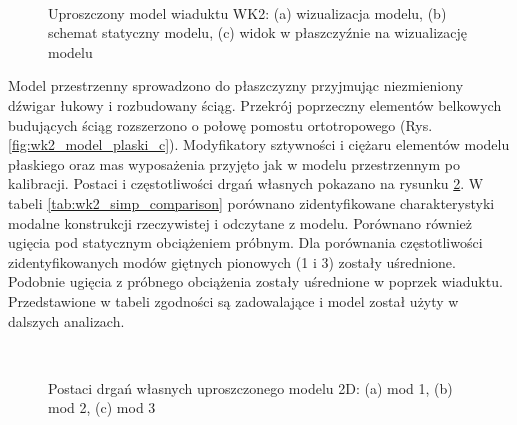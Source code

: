 \begin{figure}
	\centering
	\begin{minipage}{0.7\textwidth}
	\\
	\end{minipage}\qquad
	\begin{minipage}{0.15\textwidth}
	\end{minipage}
	\captionsetup{justification=centering}
	\caption{Uproszczony model wiaduktu WK2: (a) wizualizacja modelu, (b) schemat statyczny modelu, (c) widok w płaszczyźnie na wizualizację modelu}
	\label{fig:wk2_model_plaski}
\end{figure}



Model przestrzenny sprowadzono do płaszczyzny przyjmując niezmieniony dźwigar łukowy i rozbudowany ściąg. Przekrój poprzeczny elementów belkowych budujących ściąg rozszerzono o połowę pomostu ortotropowego (Rys. \ref{fig:wk2_model_plaski_c}). Modyfikatory sztywności i ciężaru elementów modelu płaskiego oraz mas wyposażenia przyjęto jak w modelu przestrzennym po kalibracji. Postaci i częstotliwości drgań własnych pokazano na rysunku \ref{fig:wk2_upr_mods}. W tabeli \ref{tab:wk2_simp_comparison} porównano zidentyfikowane charakterystyki modalne konstrukcji rzeczywistej i odczytane z modelu. Porównano również ugięcia pod statycznym obciążeniem próbnym. Dla porównania częstotliwości zidentyfikowanych modów giętnych pionowych (1 i 3) zostały uśrednione. Podobnie ugięcia z próbnego obciążenia zostały uśrednione w poprzek wiaduktu.
Przedstawione w tabeli zgodności są zadowalające i model został użyty w dalszych analizach.
\begin{figure}[h]
	\centering
	\\
	\captionsetup{justification=centering}
	\caption{Postaci drgań własnych uproszczonego modelu 2D: (a) mod 1, (b) mod 2, (c) mod 3}
	\label{fig:wk2_upr_mods}
\end{figure}


